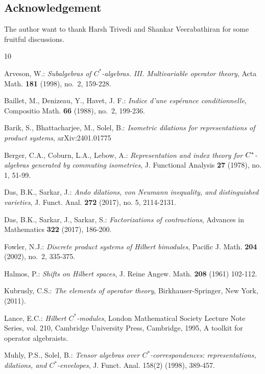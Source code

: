 \documentclass[12pt]{amsart}
\numberwithin{equation}{section}
\theoremstyle{plain}
\begin{document}
\subsection*{Acknowledgement}
 The author want to thank Harsh Trivedi and Shankar Veerabathiran for some fruitful discussions. 

	
	\begin{thebibliography}{10}
		
		Arveson, W.: \emph{Subalgebras of {$C^*$}-algebras. {III}. {M}ultivariable
			operator theory}, Acta Math. \textbf{181} (1998), no.~2, 159-228.
	
		Baillet, M., Denizeau, Y., Havet, J. F.: \emph{Indice
			d'une esp\'erance conditionnelle}, Compositio Math. \textbf{66} (1988),
		no.~2, 199-236.
		
	 Barik, S., Bhattacharjee, M., Solel, B.: \emph{Isometric dilations for representations of product systems}, arXiv:2401.01775
		
	    Berger, C.A., Coburn, L.A., Lebow, A.: \emph{Representation and index theory for $C\sp*$-algebras generated by commuting isometries},
		J. Functional Analysis \textbf{27} (1978), no. 1,
		51-99.
		
		Das, B.K., Sarkar, J.: \emph{Ando dilations, von Neumann inequality, and distinguished varieties},
		J. Funct. Anal. \textbf{272} (2017), no. 5, 2114-2131.
		
		Das, B.K., Sarkar, J., Sarkar, S.: \emph{Factorizations of contractions}, Advances in Mathematics \textbf{322} (2017), 186-200.
		
	Fowler, N.J.: \emph{Discrete product systems of Hilbert bimodules}, Pacific J. Math.
		\textbf{204} (2002), no.~2, 335-375.
		
	Halmos, P.: \emph{{S}hifts on {H}ilbert spaces}, J. Reine Angew. Math. \textbf{208}
		(1961) 102-112.
		
	Kubrusly, C.S.: \emph{The elements of operator theory}, Birkhauser-Springer, New York, (2011).
		
		Lance, E.C.: \emph{Hilbert {$C^*$}-modules}, London Mathematical Society
		Lecture Note Series, vol. 210, Cambridge University Press, Cambridge, 1995, A toolkit for operator algebraists.
		
		Muhly, P.S., Solel, B.: \emph{Tensor algebras over
			{$C^*$}-correspondences: representations, dilations, and {$C^*$}-envelopes},
		J. Funct. Anal. {158}(2) (1998), 389-457.
		

\end{thebibliography}
\end{document}
